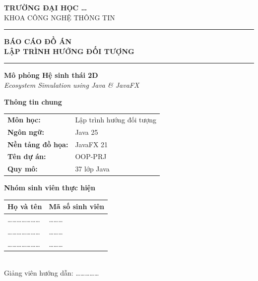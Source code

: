 \documentclass[12pt,a4paper]{report}
\begin{document}
\begin{titlepage}
    \centering
    \vspace*{0.6cm}

    {\large\textbf{TRƯỜNG ĐẠI HỌC \dots}\\[0.3em]
    \normalsize KHOA CÔNG NGHỆ THÔNG TIN}

    \vspace{1.4cm}
    \rule{\textwidth}{2pt}
    \vspace{0.5cm}

    {\Huge\bfseries\color{primaryblue}
    BÁO CÁO ĐỒ ÁN\\[0.4em]
    LẬP TRÌNH HƯỚNG ĐỐI TƯỢNG}

    \vspace{0.5cm}
    \rule{\textwidth}{2pt}
    \vspace{1cm}

    {\LARGE\bfseries Mô phỏng Hệ sinh thái 2D}\\[0.5em]
    {\large\textit{Ecosystem Simulation using Java \& JavaFX}}

    \vspace{1.6cm}

    \begin{mdframed}[backgroundcolor=infobg,linecolor=primaryblue,linewidth=1.5pt]
    \centering
    \vspace{0.3cm}
    {\large\textbf{Thông tin chung}}\\[0.8em]
    \begin{tabular}{ll}
        \textbf{Môn học:} & Lập trình hướng đối tượng \\[0.3em]
        \textbf{Ngôn ngữ:} & Java 25 \\[0.3em]
        \textbf{Nền tảng đồ họa:} & JavaFX 21 \\[0.3em]
        \textbf{Tên dự án:} & OOP-PRJ \\[0.3em]
        \textbf{Quy mô:} & 37 lớp Java \\[0.3em]
    \end{tabular}
    \vspace{0.3cm}
    \end{mdframed}

    \vspace{1.0cm}

    \begin{mdframed}[linecolor=gray!50,linewidth=0.8pt]
    \centering
    \textbf{Nhóm sinh viên thực hiện}\\[0.5em]
    \begin{tabular}{L{6cm} L{4cm}}
        Họ và tên & Mã số sinh viên \\
        \hline
        \dots\dots\dots\dots\dots\dots\dots & \dots\dots\dots \\
        \dots\dots\dots\dots\dots\dots\dots & \dots\dots\dots \\
        \dots\dots\dots\dots\dots\dots\dots & \dots\dots\dots \\
    \end{tabular}\\[0.6em]
    Giảng viên hướng dẫn: \dots\dots\dots\dots\dots
    \end{mdframed}


\end{titlepage}
\end{document}
